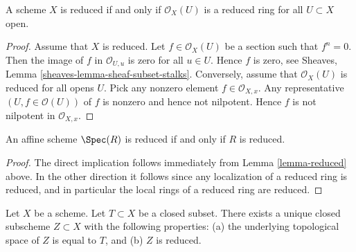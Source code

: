 \begin{lemma}
\label{lemma-reduced}
A scheme $X$ is reduced if and only if $\mathcal{O}_X(U)$
is a reduced ring for all $U \subset X$ open.
\end{lemma}

\begin{proof}
Assume that $X$ is reduced.
Let $f \in \mathcal{O}_X(U)$ be a section such that $f^n = 0$.
Then the image of $f$ in $\mathcal{O}_{U, u}$ is zero for
all $u \in U$. Hence $f$ is zero, see
Sheaves, Lemma \ref{sheaves-lemma-sheaf-subset-stalks}.
Conversely, assume that $\mathcal{O}_X(U)$ is reduced
for all opens $U$. Pick any nonzero element $f \in \mathcal{O}_{X, x}$.
Any representative $(U, f \in \mathcal{O}(U))$  of $f$ is nonzero and
hence not nilpotent. Hence $f$ is not nilpotent in $\mathcal{O}_{X, x}$.
\end{proof}

\begin{lemma}
\label{lemma-affine-reduced}
An affine scheme $\Spec(R)$ is reduced
if and only if $R$ is reduced.
\end{lemma}

\begin{proof}
The direct implication follows immediately from
Lemma \ref{lemma-reduced} above.
In the other direction it follows since any localization of
a reduced ring is reduced, and in particular the local rings
of a reduced ring are reduced.
\end{proof}

\begin{lemma}
\label{lemma-reduced-closed-subscheme}
Let $X$ be a scheme. Let $T \subset X$ be a closed subset.
There exists a unique closed subscheme $Z \subset X$ with
the following properties: (a) the underlying topological
space of $Z$ is equal to $T$, and (b) $Z$ is reduced.
\end{lemma}

